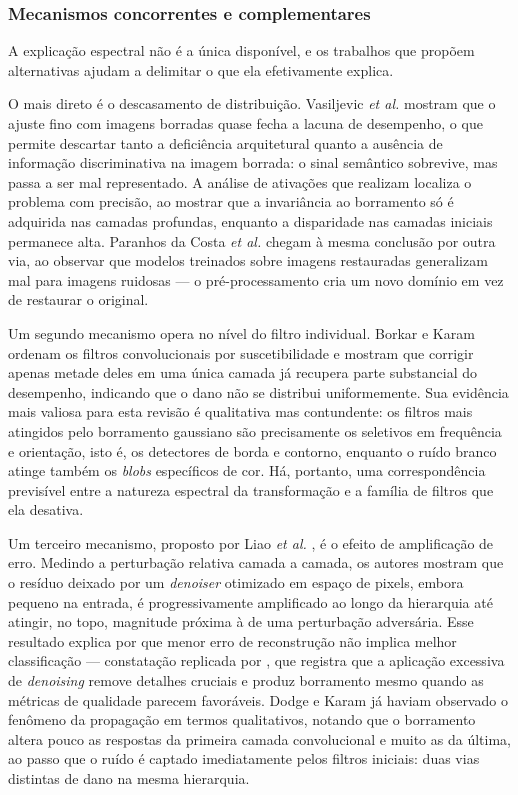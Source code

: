 \documentclass[conference]{IEEEtran}
\begin{document}
\subsubsection{Mecanismos concorrentes e complementares}

A explicação espectral não é a única disponível, e os trabalhos que propõem
alternativas ajudam a delimitar o que ela efetivamente explica.

O mais direto é o descasamento de distribuição. Vasiljevic \textit{et al.}
\cite{b4} mostram que o ajuste fino com imagens borradas quase fecha a lacuna
de desempenho, o que permite descartar tanto a deficiência arquitetural quanto
a ausência de informação discriminativa na imagem borrada: o sinal semântico
sobrevive, mas passa a ser mal representado. A análise de ativações que
realizam localiza o problema com precisão, ao mostrar que a invariância ao
borramento só é adquirida nas camadas profundas, enquanto a disparidade nas
camadas iniciais permanece alta. Paranhos da Costa \textit{et al.} \cite{b8}
chegam à mesma conclusão por outra via, ao observar que modelos treinados sobre
imagens restauradas generalizam mal para imagens ruidosas --- o
pré-processamento cria um novo domínio em vez de restaurar o original.

Um segundo mecanismo opera no nível do filtro individual. Borkar e Karam
\cite{b25} ordenam os filtros convolucionais por suscetibilidade e mostram que
corrigir apenas metade deles em uma única camada já recupera parte substancial
do desempenho, indicando que o dano não se distribui uniformemente. Sua
evidência mais valiosa para esta revisão é qualitativa mas contundente: os
filtros mais atingidos pelo borramento gaussiano são precisamente os seletivos
em frequência e orientação, isto é, os detectores de borda e contorno, enquanto
o ruído branco atinge também os \textit{blobs} específicos de cor. Há,
portanto, uma correspondência previsível entre a natureza espectral da
transformação e a família de filtros que ela desativa.

Um terceiro mecanismo, proposto por Liao \textit{et al.} \cite{b7}, é o efeito
de amplificação de erro. Medindo a perturbação relativa camada a camada, os
autores mostram que o resíduo deixado por um \textit{denoiser} otimizado em
espaço de pixels, embora pequeno na entrada, é progressivamente amplificado ao
longo da hierarquia até atingir, no topo, magnitude próxima à de uma
perturbação adversária. Esse resultado explica por que menor erro de
reconstrução não implica melhor classificação --- constatação replicada por
\cite{b26}, que registra que a aplicação excessiva de \textit{denoising} remove
detalhes cruciais e produz borramento mesmo quando as métricas de qualidade
parecem favoráveis. Dodge e Karam \cite{b1} já haviam observado o fenômeno da
propagação em termos qualitativos, notando que o borramento altera pouco as
respostas da primeira camada convolucional e muito as da última, ao passo que o
ruído é captado imediatamente pelos filtros iniciais: duas vias distintas de
dano na mesma hierarquia.
\end{document}
